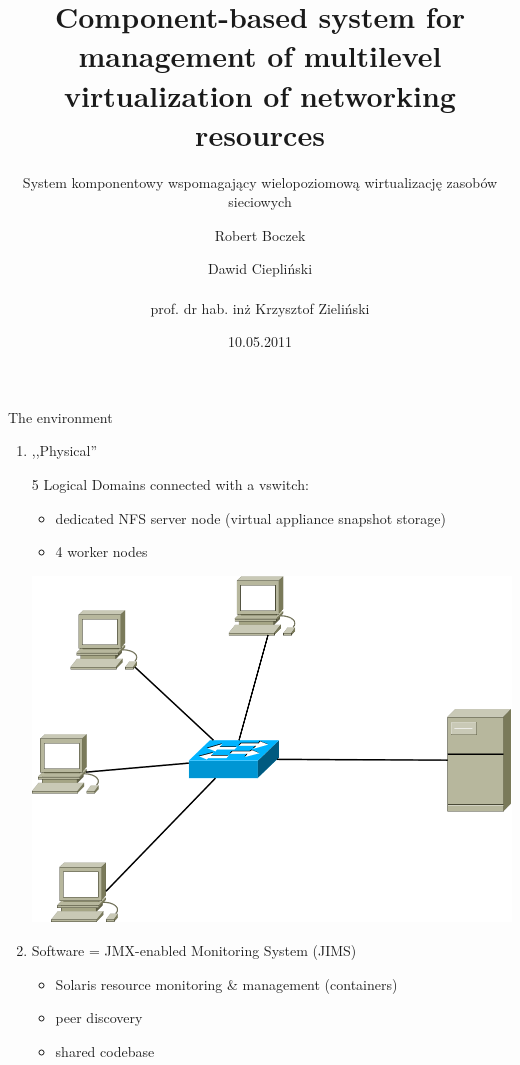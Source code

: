 \documentclass{beamer}
\title{Component-based system for management of multilevel virtualization of networking resources}
\subtitle{System komponentowy wspomagający wielopoziomową wirtualizację zasobów sieciowych}
\author{Robert Boczek \and Dawid Ciepliński \\ ~ \\ prof. dr hab. inż Krzysztof Zieliński}
\date{10.05.2011}
\begin{document}
	\begin{frame}
		\titlepage
	\end{frame}


	\begin{frame}{The environment}

		\begin{enumerate}

			\item ,,Physical''

				5 Logical Domains connected with a vswitch:

				\begin{itemize}
					\item dedicated NFS server node (virtual appliance snapshot storage)
					\item 4 worker nodes
				\end{itemize}

				\begin{center}
				\includegraphics[scale=.2]{img/env.pdf}
				\end{center}

				\pause

			\item Software = JMX-enabled Monitoring System (JIMS)

				\begin{itemize}
					\item Solaris resource monitoring \& management (containers)
					\item peer discovery
					\item shared codebase
				\end{itemize}
		
		\end{enumerate}

	\end{frame}
\end{document}

